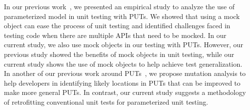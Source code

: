 In our previous work~\cite{marri09:empirical}, we presented an empirical study to analyze the use of parameterized model in unit testing with PUTs. We showed that using a mock object can ease the process of unit testing and identified challenges faced in testing code when there are multiple APIs that need to be mocked. In our current study, we also use mock objects in our testing with PUTs. However, our previous study showed the benefits of mock objects in unit testing, while our current study shows the use of mock objects to help achieve test generalization. In another of our previous work around PUTs~\cite{xie09:mutation}, we propose mutation analysis to help developers in identifying likely locations in PUTs that can be improved to make more general PUTs. In contrast, our current study suggests a methodology of retrofitting conventional unit tests for parameterized unit testing.